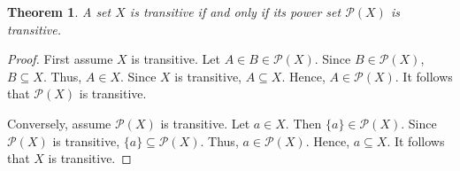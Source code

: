 \documentclass[12pt]{article}
\newtheorem*{thm*}{Theorem}
\begin{document}
\begin{thm*}
A set $X$ is transitive if and only if its power set $\mathcal{P}(X)$ is transitive.
\end{thm*}

\begin{proof}
First assume $X$ is transitive.  Let $A \in B \in \mathcal{P}(X)$.  Since $B \in \mathcal{P}(X)$, $B \subseteq X$.  Thus, $A \in X$.  Since $X$ is transitive, $A \subseteq X$.  Hence, $A \in \mathcal{P}(X)$.  It follows that $\mathcal{P}(X)$ is transitive.

Conversely, assume $\mathcal{P}(X)$ is transitive.  Let $a \in X$.  Then $\{a\} \in \mathcal{P}(X)$.  Since $\mathcal{P}(X)$ is transitive, $\{a\} \subseteq \mathcal{P}(X)$.  Thus, $a \in \mathcal{P}(X)$.  Hence, $a \subseteq X$.  It follows that $X$ is transitive.
\end{proof}
\end{document}
